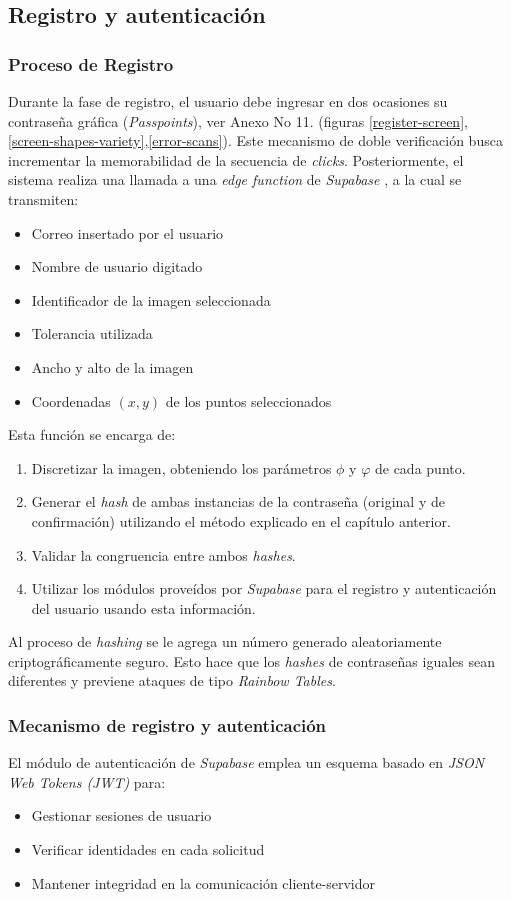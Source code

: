 \subsection{Registro y autenticaci\'on}
\subsubsection{Proceso de Registro}
Durante la fase de registro, el usuario debe ingresar en dos ocasiones su contraseña gráfica (\textit{Passpoints}), ver Anexo No 11. (figuras \ref{register-screen},  \ref{screen-shapes-variety},\ref{error-scans}). Este mecanismo de doble verificación busca incrementar la memorabilidad de la secuencia de \textit{clicks}. Posteriormente, el sistema realiza una llamada a una \textit{edge function} de \textit{Supabase} , a la cual se transmiten:

\begin{itemize}
	\item Correo insertado por el usuario
	\item Nombre de usuario digitado
	\item Identificador de la imagen seleccionada
	\item Tolerancia utilizada 
	\item Ancho y alto de la imagen
	\item Coordenadas $(x,y)$ de los puntos seleccionados
\end{itemize}

Esta función se encarga de: 
\begin{enumerate}
	\item Discretizar la imagen, obteniendo los parámetros $\phi$  y $\varphi$ de cada punto.
	\item Generar el \textit{hash} de ambas instancias de la contraseña (original y de confirmación) utilizando el m\'etodo explicado en el cap\'itulo anterior.
	\item Validar la congruencia entre ambos \textit{hashes}.
	\item Utilizar los m\'odulos prove\'idos por \textit{Supabase}  para el registro y autenticaci\'on del usuario usando esta informaci\'on.
\end{enumerate}

Al proceso de \textit{hashing} se le agrega un n\'umero generado aleatoriamente criptogr\'aficamente seguro. Esto hace que los \textit{hashes} de contrase\~nas iguales sean diferentes y previene ataques de tipo \textit{Rainbow Tables}.

\subsubsection{Mecanismo de registro y autenticaci\'on}
El módulo de autenticación de \textit{Supabase}  emplea un esquema basado en \textit{JSON Web Tokens (JWT)} para:
\begin{itemize}
	\item Gestionar sesiones de usuario
	\item Verificar identidades en cada solicitud
	\item Mantener integridad en la comunicación cliente-servidor
\end{itemize}

